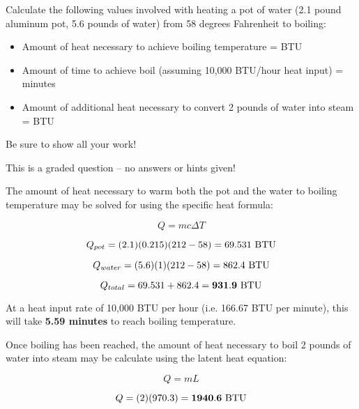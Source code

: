 

Calculate the following values involved with heating a pot of water (2.1 pound aluminum pot, 5.6 pounds of water) from 58 degrees Fahrenheit to boiling:

\vskip 10pt

\begin{itemize}
\item{} Amount of heat necessary to achieve boiling temperature = \underbar{\hskip 50pt} BTU
\vskip 5pt
\item{} Amount of time to achieve boil (assuming 10,000 BTU/hour heat input) = \underbar{\hskip 50pt} minutes
\vskip 5pt
\item{} Amount of additional heat necessary to convert 2 pounds of water into steam = \underbar{\hskip 50pt} BTU
\end{itemize}

\vskip 10pt

\noindent
Be sure to show all your work!

\vfil 

\eject






This is a graded question -- no answers or hints given!







The amount of heat necessary to warm both the pot and the water to boiling temperature may be solved for using the specific heat formula:

$$Q = mc \Delta T$$

$$Q_{pot} = (2.1) (0.215) (212-58) = 69.531 \hbox{ BTU}$$

$$Q_{water} = (5.6) (1) (212-58) = 862.4 \hbox{ BTU}$$

$$Q_{total} = 69.531 + 862.4 = {\bf 931.9 \hbox{ BTU}}$$

\vskip 10pt

At a heat input rate of 10,000 BTU per hour (i.e. 166.67 BTU per minute), this will take {\bf 5.59 minutes} to reach boiling temperature.

\vskip 10pt

Once boiling has been reached, the amount of heat necessary to boil 2 pounds of water into steam may be calculate using the latent heat equation:

$$Q = mL$$

$$Q = (2)(970.3) = {\bf 1940.6 \hbox{ BTU}}$$





